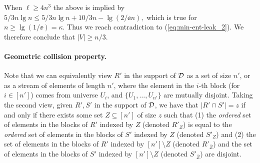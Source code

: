 When $\ell \geq 4n^3$ the above is implied by
$
5/3 n \lg n \leq 5/3 n \lg n + 10/3 n - \lg (2/\ee n),
$
which is true for $n \geq \lg(1/\ee) = \kappa$.
Thus we reach contradiction to (\ref{eq:min-ent-leak_2}). %
%
We therefore
conclude that $|V| \geq n/3$.

\paragraph{Geometric collision property.}
Note that we can equivalently view $R'$ in the support of ${\cal D}$ as a set of size $n'$, or as a stream of elements of length $n'$, where the element in the $i$-th block (for $i \in [n']$) comes from universe $U_{i}$, and $\{U_{1}, \ldots, U_{n'}\}$ are mutually disjoint.
Taking the second view, given $R',S'$ in the support of 
${\cal D}$, we have that $|R' \cap S'| = z$ if and only if
there exists some set $Z \subseteq [n']$ of size $z$
such that (1) the \emph{ordered} set of elements in the blocks of $R'$ indexed by $Z$
(denoted $R'_{Z}$)
is equal to the \emph{ordered} set of elements in the blocks of $S'$ indexed by $Z$
(denoted $S'_{Z}$)
and (2) the set of elements in the blocks of $R'$ indexed by $[n'] \setminus Z$
(denoted $R'_{ \overline{Z}}$)
and the set of elements in the blocks of $S'$ indexed by $[n'] \setminus Z$
(denoted $S'_{ \overline{Z}}$) are disjoint.


